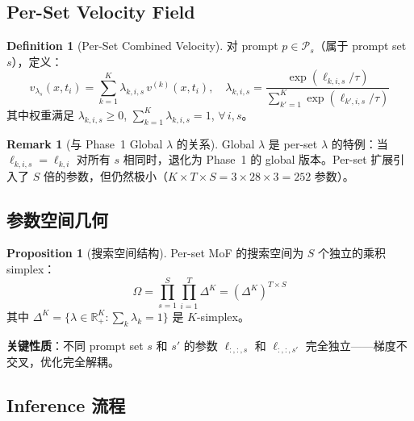 \documentclass[11pt,a4paper]{article}
\newcommand{\R}{\mathbb{R}}
\theoremstyle{definition}
\newtheorem{definition}{Definition}
\newtheorem{remark}{Remark}
\newtheorem{proposition}{Proposition}
\begin{document}
\subsection{Per-Set Velocity Field}

\begin{definition}[Per-Set Combined Velocity]
对 prompt $p \in \mathcal{P}_s$（属于 prompt set $s$），定义：
\begin{equation}
\boxed{
v_{\lambda_s}(x, t_i) = \sum_{k=1}^K \lambda_{k,i,s}\, v^{(k)}(x, t_i), \quad
\lambda_{k,i,s} = \frac{\exp(\ell_{k,i,s}/\tau)}{\sum_{k'=1}^K \exp(\ell_{k',i,s}/\tau)}
}
\label{eq:per_set_velocity}
\end{equation}
其中权重满足 $\lambda_{k,i,s} \geq 0$, $\sum_{k=1}^K \lambda_{k,i,s} = 1$, $\forall\, i, s$。
\end{definition}

\begin{remark}[与 Phase~1 Global $\lambda$ 的关系]
Global $\lambda$ 是 per-set $\lambda$ 的特例：当 $\ell_{k,i,s} = \ell_{k,i}$ 对所有 $s$ 相同时，退化为 Phase~1 的 global 版本。Per-set 扩展引入了 $S$ 倍的参数，但仍然极小（$K \times T \times S = 3 \times 28 \times 3 = 252$ 参数）。
\end{remark}

\subsection{参数空间几何}

\begin{proposition}[搜索空间结构]
Per-set MoF 的搜索空间为 $S$ 个独立的乘积 simplex：
\begin{equation}
\Omega = \prod_{s=1}^S \prod_{i=1}^T \Delta^K = \left(\Delta^K\right)^{T \times S}
\end{equation}
其中 $\Delta^K = \{\lambda \in \R^K_+ : \sum_k \lambda_k = 1\}$ 是 $K$-simplex。

\textbf{关键性质}：不同 prompt set $s$ 和 $s'$ 的参数 $\ell_{:,:,s}$ 和 $\ell_{:,:,s'}$ 完全独立——梯度不交叉，优化完全解耦。
\end{proposition}

\subsection{Inference 流程}
\end{document}
